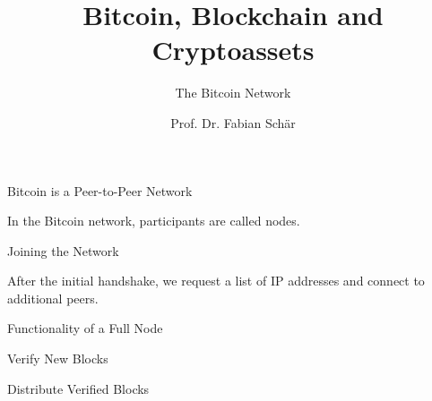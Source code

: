 \documentclass[handout]{beamer}
\title{Bitcoin, Blockchain and Cryptoassets}
\subtitle{The Bitcoin Network}
\author{Prof. Dr. Fabian Schär}
\institute{University of Basel}
\begin{document}
\thispagestyle{empty}
\begin{frame}[noframenumbering]
	\titlepage
\end{frame}

\begin{frame}{Bitcoin is a Peer-to-Peer Network}
	\centering
	\begin{tikzpicture}[scale=1, every node/.style={scale=1}]
		
	\end{tikzpicture}
	
	\vspace{0.5cm}
	
	In the Bitcoin network, participants are called \color{focus}nodes\color{black}.
\end{frame}

\begin{frame}{Joining the Network}
	\begin{center}
		\begin{tikzpicture}[scale=1, every node/.style={scale=1}]
			
		\end{tikzpicture}
	\end{center}

	\vspace{1cm}
	
	After the initial handshake, we request a list of IP addresses and connect to additional peers.
\end{frame}

\begin{frame}{Functionality of a Full Node}
	\centering
	\begin{tikzpicture}[scale=1, every node/.style={scale=1}]
		
	\end{tikzpicture}
\end{frame}


\begin{frame}{Verify New Blocks}
	
	\begin{tikzpicture}[scale=1, every node/.style={scale=1}]
		
	\end{tikzpicture}
\end{frame}

\begin{frame}{Distribute Verified Blocks}
	
	\begin{tikzpicture}[scale=1, every node/.style={scale=1}]
		
	\end{tikzpicture}
\end{frame}
\end{document}
